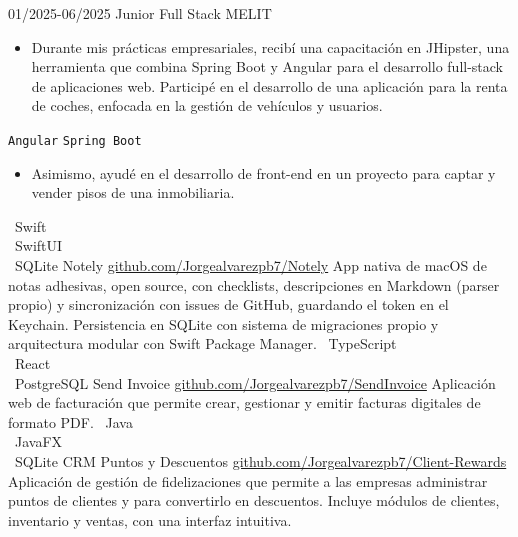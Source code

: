 \documentclass[9pt]{./src/developercv} %
\begin{document}
\begin{entrylist}
	\entry
	{01/2025-06/2025}
	{Junior Full Stack}
	{MELIT}
	{\vspace{-10pt}
		\begin{itemize}[noitemsep,topsep=0pt,parsep=0pt,partopsep=0pt, leftmargin=-1pt]
			\item {Durante mis prácticas empresariales, recibí una capacitación en JHipster, una herramienta que combina Spring Boot y Angular para el desarrollo full-stack de aplicaciones web. Participé en el desarrollo de una aplicación para la renta de coches, enfocada en la gestión de vehículos y usuarios.}
		\end{itemize}
		\texttt{Angular} \slashsep \texttt{Spring Boot}
	\vspace{2 pt}
		\begin{itemize}[noitemsep,topsep=0pt,parsep=0pt,partopsep=0pt, leftmargin=-1pt]
			\item {Asimismo, ayudé en el desarrollo de front-end en un proyecto para captar y vender pisos de una inmobiliaria.}
		\end{itemize}}
\end{entrylist}

\begin{entrylist}
	\entry
	{ \textbullet\ Swift \\ \textbullet\ SwiftUI \\ \textbullet\ SQLite}
	{Notely}
	{\href {https://github.com/Jorgealvarezpb7/Notely}          {github.com/Jorgealvarezpb7/Notely}}
	{App nativa de macOS de notas adhesivas, open source, con checklists, descripciones en Markdown (parser propio) y sincronización con issues de GitHub, guardando el token en el Keychain. Persistencia en SQLite con sistema de migraciones propio y arquitectura modular con Swift Package Manager.}
	\entry
	{ \textbullet\ TypeScript \\ \textbullet\ React \\ \textbullet\ PostgreSQL}
	{Send Invoice}
	{\href {https://github.com/Jorgealvarezpb7/SendInvoice}          {github.com/Jorgealvarezpb7/SendInvoice}}
	{Aplicación web de facturación que permite crear, gestionar y emitir facturas digitales de formato PDF.}
	\entry
	{ \textbullet\ Java \\ \textbullet\ JavaFX \\ \textbullet\ SQLite}
	{CRM Puntos y Descuentos}
	{\href {https://github.com/Jorgealvarezpb7/Client-Rewards}          {github.com/Jorgealvarezpb7/Client-Rewards}}
	{Aplicación de gestión de fidelizaciones que permite a las empresas administrar puntos de clientes y para convertirlo en descuentos. Incluye módulos de clientes, inventario y ventas, con una interfaz intuitiva.}
\end{entrylist}
\end{document}
